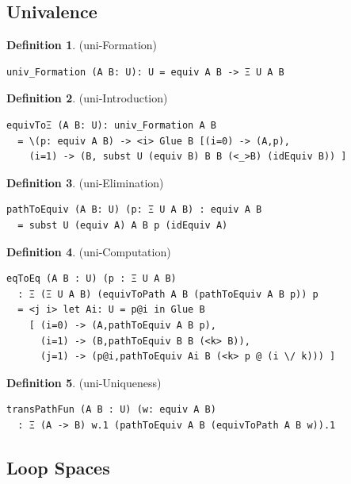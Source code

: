 \documentclass{article}
\theoremstyle{definition}
\newtheorem{definition}{Definition}
\begin{document}
\newpage
\subsection{Univalence}

\begin{definition} (uni-Formation)
\begin{lstlisting}
univ_Formation (A B: U): U = equiv A B -> Ξ U A B
\end{lstlisting}
\end{definition}

\begin{definition} (uni-Introduction)
\begin{lstlisting}
equivToΞ (A B: U): univ_Formation A B
  = \(p: equiv A B) -> <i> Glue B [(i=0) -> (A,p),
    (i=1) -> (B, subst U (equiv B) B B (<_>B) (idEquiv B)) ]
\end{lstlisting}
\end{definition}

\begin{definition} (uni-Elimination)
\begin{lstlisting}
pathToEquiv (A B: U) (p: Ξ U A B) : equiv A B
  = subst U (equiv A) A B p (idEquiv A)
\end{lstlisting}
\end{definition}

\begin{definition} (uni-Computation)
\begin{lstlisting}
eqToEq (A B : U) (p : Ξ U A B)
  : Ξ (Ξ U A B) (equivToPath A B (pathToEquiv A B p)) p
  = <j i> let Ai: U = p@i in Glue B
    [ (i=0) -> (A,pathToEquiv A B p),
      (i=1) -> (B,pathToEquiv B B (<k> B)),
      (j=1) -> (p@i,pathToEquiv Ai B (<k> p @ (i \/ k))) ]

\end{lstlisting}
\end{definition}

\begin{definition} (uni-Uniqueness)
\begin{lstlisting}
transPathFun (A B : U) (w: equiv A B)
  : Ξ (A -> B) w.1 (pathToEquiv A B (equivToPath A B w)).1
\end{lstlisting}
\end{definition}

\newpage
\subsection{Loop Spaces}
\end{document}
